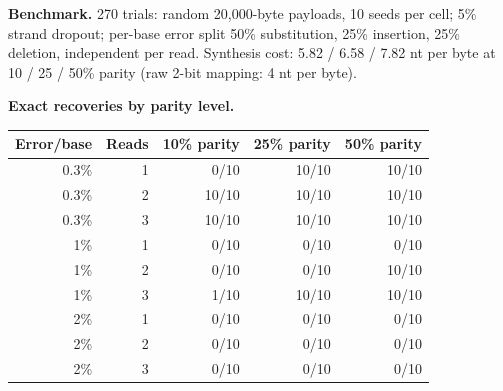 \documentclass[11pt,a4paper]{article}
\begin{document}
\textbf{Benchmark.} 270 trials: random 20{,}000-byte payloads, 10 seeds per
cell; 5\% strand dropout; per-base error split 50\% substitution, 25\% insertion, 25\%
deletion, independent per read. Synthesis cost: 5.82 / 6.58 / 7.82 nt per byte at
10 / 25 / 50\% parity (raw 2-bit mapping: 4 nt per byte).
\begin{center}
\end{center}
\par\noindent\begin{minipage}{\linewidth}
\textbf{Exact recoveries by parity level.}
\begin{center}\small
\begin{tabular}{rrrrr}
\toprule
Error/base & Reads & 10\% parity & 25\% parity & 50\% parity\\
\midrule
0.3\% & 1 & 0/10 & 10/10 & 10/10 \\
0.3\% & 2 & 10/10 & 10/10 & 10/10 \\
0.3\% & 3 & 10/10 & 10/10 & 10/10 \\
1\% & 1 & 0/10 & 0/10 & 0/10 \\
1\% & 2 & 0/10 & 0/10 & 10/10 \\
1\% & 3 & 1/10 & 10/10 & 10/10 \\
2\% & 1 & 0/10 & 0/10 & 0/10 \\
2\% & 2 & 0/10 & 0/10 & 0/10 \\
2\% & 3 & 0/10 & 0/10 & 0/10 \\
\bottomrule
\end{tabular}
\end{center}
\end{minipage}
\end{document}

